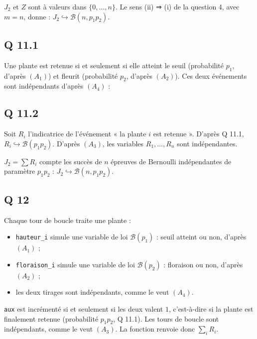 \documentclass[11pt,a4paper]{article}
\providecommand{\tightlist}{\setlength{\itemsep}{0pt}\setlength{\parskip}{0pt}}
\newcommand{\equationajustee}[1]{%
  \sbox{\boiteequation}{$\displaystyle #1$}%
  \ifdim\wd\boiteequation>\linewidth
    \[\resizebox{\linewidth}{!}{\usebox{\boiteequation}}\]%
  \else
    \[#1\]%
  \fi}
\begin{document}
\(J_2\) et \(Z\) sont à valeurs dans \(\{0,\dots,n\}\). Le sens (ii) ⇒ (i) de la question 4, avec \(m=n\), donne : \textbf{\(J_2\hookrightarrow\mathcal B(n,p_1p_2)\)}.

\hypertarget{q-11.1}{%
\subsection{Q 11.1}\label{q-11.1}}

Une plante est retenue si et seulement si elle atteint le seuil (probabilité \(p_1\), d'après \((A_1)\)) et fleurit (probabilité \(p_2\), d'après \((A_2)\)). Ces deux événements sont indépendants d'après \((A_4)\) :

\equationajustee{\boxed{P(\text{plante retenue})=p_1p_2}}

\hypertarget{q-11.2}{%
\subsection{Q 11.2}\label{q-11.2}}

Soit \(R_i\) l'indicatrice de l'événement « la plante \(i\) est retenue ». D'après Q 11.1, \(R_i\hookrightarrow\mathcal B(p_1p_2)\). D'après \((A_3)\), les variables \(R_1,\dots,R_n\) sont indépendantes.

\(J_2=\sum R_i\) compte les succès de \(n\) épreuves de Bernoulli indépendantes de paramètre \(p_1p_2\) : \textbf{\(J_2\hookrightarrow\mathcal B(n,p_1p_2)\)}.

\hypertarget{q-12}{%
\subsection{Q 12}\label{q-12}}

Chaque tour de boucle traite une plante :

\begin{itemize}
\tightlist
\item
  \texttt{hauteur\_i} simule une variable de loi \(\mathcal B(p_1)\) : seuil atteint ou non, d'après \((A_1)\) ;
\item
  \texttt{floraison\_i} simule une variable de loi \(\mathcal B(p_2)\) : floraison ou non, d'après \((A_2)\) ;
\item
  les deux tirages sont indépendants, comme le veut \((A_4)\).
\end{itemize}

\texttt{aux} est incrémenté si et seulement si les deux valent \(1\), c'est-à-dire si la plante est finalement retenue (probabilité \(p_1p_2\), Q 11.1). Les tours de boucle sont indépendants, comme le veut \((A_3)\). La fonction renvoie donc \(\sum_iR_i\).
\end{document}
